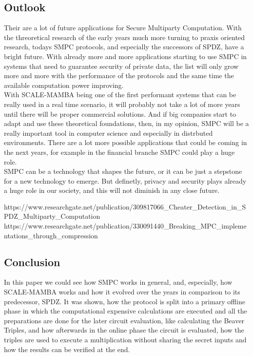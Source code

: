 \documentclass[english,runningheads,a4paper]{llncs}[2018/03/10]
\begin{document}
\subsection{Outlook}
Their are a lot of future applications for Secure Multiparty Computation. With the threoretical research of the early years much more turning to praxis oriented research, todays SMPC protocols, and especially the successors of SPDZ, have a bright future. With already more and more applications starting to use SMPC in systems that need to guarantee security of private data, the list will only grow more and more with the performance of the protocols and the same time the available computation power improving. \\
With SCALE-MAMBA being one of the first performant systems that can be really used in a real time scenario, it will probably not take a lot of more years until there will be proper commercial solutions. And if big companies start to adapt and use these theoretical foundations, then, in my opinion, SMPC will be a really important tool in computer science and especially in distrbuted environments. There are a lot more possible applications that could be coming in the next years, for example in the financial branche SMPC could play a huge role.\\
SMPC can be a technology that shapes the future, or it can be just a stepstone for a new technology to emerge. But definetly, privacy and security plays already a huge role in our society, and this will not diminish in any close future.


https://www.researchgate.net/publication/309817066\_Cheater\_Detection\_in\_SPDZ\_Multiparty\_Computation
https://www.researchgate.net/publication/330091440\_Breaking\_MPC\_implementations\_through\_compression


\subsection{Conclusion}

In this paper we could see how SMPC works in general, and, especially, how SCALE-MAMBA works and how it evolved over the years in comparison to its predecessor, SPDZ. It was shown, how the protocol is split into a primary offline phase in which the computational expensive calculations are executed and all the preparations are done for the later circuit evaluation, like calculating the Beaver Triples, and how afterwards in the online phase the circuit is evaluated, how the triples are used to execute a multiplication without sharing the secret inputs and how the results can be verified at the end. 
\end{document}
